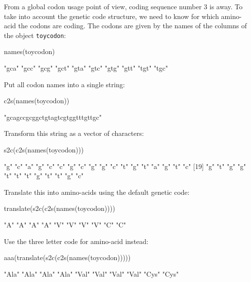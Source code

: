 \documentclass{article}
\begin{document}
From a global codon usage point of view, coding sequence number 3 is away.
To take into account the genetic code structure, we need to know for which amino-acid the codons are coding.
The codons are given by the names of the columns of the object \texttt{toycodon}:

\begin{Schunk}
\begin{Sinput}
 names(toycodon)
\end{Sinput}
\begin{Soutput}
 [1] "gca" "gcc" "gcg" "gct" "gta" "gtc" "gtg" "gtt" "tgt" "tgc"
\end{Soutput}
\end{Schunk}


Put all codon names into a single string:

\begin{Schunk}
\begin{Sinput}
 c2s(names(toycodon))
\end{Sinput}
\begin{Soutput}
[1] "gcagccgcggctgtagtcgtggtttgttgc"
\end{Soutput}
\end{Schunk}

Transform this string as a vector of characters:

\begin{Schunk}
\begin{Sinput}
 s2c(c2s(names(toycodon)))
\end{Sinput}
\begin{Soutput}
 [1] "g" "c" "a" "g" "c" "c" "g" "c" "g" "g" "c" "t" "g" "t" "a" "g" "t" "c"
[19] "g" "t" "g" "g" "t" "t" "t" "g" "t" "t" "g" "c"
\end{Soutput}
\end{Schunk}

Translate this into amino-acids using the default genetic code:

\begin{Schunk}
\begin{Sinput}
 translate(s2c(c2s(names(toycodon))))
\end{Sinput}
\begin{Soutput}
 [1] "A" "A" "A" "A" "V" "V" "V" "V" "C" "C"
\end{Soutput}
\end{Schunk}

Use the three letter code for amino-acid instead:

\begin{Schunk}
\begin{Sinput}
 aaa(translate(s2c(c2s(names(toycodon)))))
\end{Sinput}
\begin{Soutput}
 [1] "Ala" "Ala" "Ala" "Ala" "Val" "Val" "Val" "Val" "Cys" "Cys"
\end{Soutput}
\end{Schunk}
\end{document}
